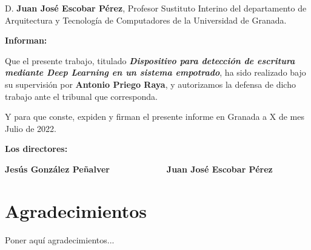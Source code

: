 \vspace{0.5cm}

D. \textbf{Juan José Escobar Pérez}, Profesor Sustituto Interino del departamento de Arquitectura y Tecnología de Computadores de la Universidad de Granada.

\vspace{0.5cm}

\textbf{Informan:}

\vspace{0.5cm}

Que el presente trabajo, titulado \textit{\textbf{Dispositivo para detección de escritura mediante Deep Learning en
un sistema empotrado}},
ha sido realizado bajo su supervisión por \textbf{Antonio Priego Raya}, y autorizamos la defensa de dicho trabajo ante el tribunal
que corresponda.

\vspace{0.5cm}

Y para que conste, expiden y firman el presente informe en Granada a X de mes Julio de 2022.

\vspace{1cm}

\textbf{Los directores:}

\vspace{5cm}

\noindent \textbf{Jesús González Peñalver \ \ \ \ \ \ \ \ \ \ \ Juan José Escobar Pérez}

\chapter*{Agradecimientos}
\thispagestyle{empty}

       \vspace{1cm}


Poner aquí agradecimientos...

